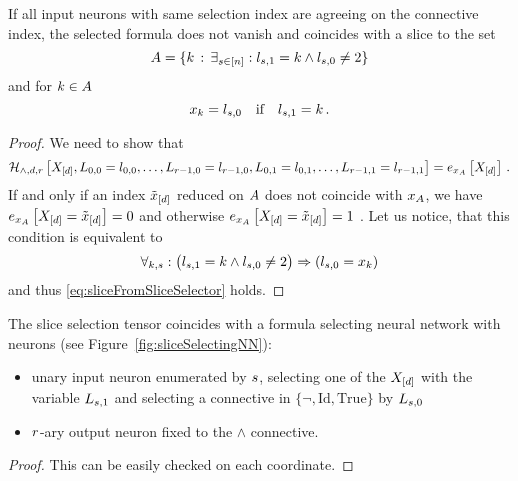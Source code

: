 \begin{lemma}\label{lem:sliceFromSliceSelector}
	If all input neurons with same selection index are agreeing on the connective index, the selected formula does not vanish and coincides with a slice to the set
		\[ A = \{ k \, : \, \exists_{s\in[n]}: l_{s,1} = k \land l_{s,0} \neq 2 \} \]
	and for $k\in A$
		\[ x_{k} = l_{s,0} \quad \text{if} \quad l_{s,1} = k \, . \]
\end{lemma}
\begin{proof}
	We need to show that 
	\begin{align}\label{eq:sliceFromSliceSelector}
	  	\mathcal{H}_{\land,d,r}\left[X_{[d]},L_{0,0}=l_{0,0},\ldots,L_{r-1,0}=l_{r-1,0},L_{0,1}=l_{0,1},\ldots,L_{r-1,1}=l_{r-1,1}\right] = e_{x_{A}}\left[X_{[d]}\right] \, . 
	\end{align}
	If and only if an index $\tilde{x}_{[d]}$ reduced on $A$ does not coincide with $x_{A}$, we have $e_{x_{A}}\left[X_{[d]}=\tilde{x}_{[d]}\right]=0$ and otherwise $e_{x_{A}}\left[X_{[d]}=\tilde{x}_{[d]}\right]=1$ .
	Let us notice, that this condition is equivalent to 
		\[ \forall_{k,s} : \big(  l_{s,1} = k \land l_{s,0} \neq 2 \big) \Rightarrow  (l_{s,0} = x_{k}) \]
	and thus \eqref{eq:sliceFromSliceSelector} holds.
\end{proof}


\begin{lemma}\label{lem:fsnnRepresentingSliceSelector}
	The slice selection tensor coincides with a formula selecting neural network with neurons (see Figure~\ref{fig:sliceSelectingNN}):
	\begin{itemize}
		\item unary input neuron enumerated by $s$, selecting one of the $X_{[d]}$ with the variable $L_{s,1}$ and selecting a connective in $\{\lnot, \mathrm{Id}, \mathrm{True}\}$ by $L_{s,0}$
		\item $r$-ary output neuron fixed to the $\land$ connective.
	\end{itemize}
\end{lemma}
\begin{proof}
	This can be easily checked on each coordinate.
\end{proof}

